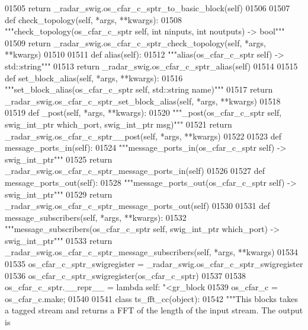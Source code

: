 \begin{DoxyCode}
{{{{{{01505         \textcolor{keywordflow}{return} \_radar\_swig.os\_cfar\_c\_sptr\_to\_basic\_block(self)
01506 
01507     \textcolor{keyword}{def }check_topology(self, *args, **kwargs):
01508         \textcolor{stringliteral}{"""check\_topology(os\_cfar\_c\_sptr self, int ninputs, int noutputs) -> bool"""}
01509         \textcolor{keywordflow}{return} \_radar\_swig.os\_cfar\_c\_sptr\_check\_topology(self, *args, **kwargs)
01510 
01511     \textcolor{keyword}{def }alias(self):
01512         \textcolor{stringliteral}{"""alias(os\_cfar\_c\_sptr self) -> std::string"""}
01513         \textcolor{keywordflow}{return} \_radar\_swig.os\_cfar\_c\_sptr\_alias(self)
01514 
01515     \textcolor{keyword}{def }set_block_alias(self, *args, **kwargs):
01516         \textcolor{stringliteral}{"""set\_block\_alias(os\_cfar\_c\_sptr self, std::string name)"""}
01517         \textcolor{keywordflow}{return} \_radar\_swig.os\_cfar\_c\_sptr\_set\_block\_alias(self, *args, **kwargs)
01518 
01519     \textcolor{keyword}{def }_post(self, *args, **kwargs):
01520         \textcolor{stringliteral}{"""\_post(os\_cfar\_c\_sptr self, swig\_int\_ptr which\_port, swig\_int\_ptr msg)"""}
01521         \textcolor{keywordflow}{return} \_radar\_swig.os\_cfar\_c\_sptr\_\_post(self, *args, **kwargs)
01522 
01523     \textcolor{keyword}{def }message_ports_in(self):
01524         \textcolor{stringliteral}{"""message\_ports\_in(os\_cfar\_c\_sptr self) -> swig\_int\_ptr"""}
01525         \textcolor{keywordflow}{return} \_radar\_swig.os\_cfar\_c\_sptr\_message\_ports\_in(self)
01526 
01527     \textcolor{keyword}{def }message_ports_out(self):
01528         \textcolor{stringliteral}{"""message\_ports\_out(os\_cfar\_c\_sptr self) -> swig\_int\_ptr"""}
01529         \textcolor{keywordflow}{return} \_radar\_swig.os\_cfar\_c\_sptr\_message\_ports\_out(self)
01530 
01531     \textcolor{keyword}{def }message_subscribers(self, *args, **kwargs):
01532         \textcolor{stringliteral}{"""message\_subscribers(os\_cfar\_c\_sptr self, swig\_int\_ptr which\_port) -> swig\_int\_ptr"""}
01533         \textcolor{keywordflow}{return} \_radar\_swig.os\_cfar\_c\_sptr\_message\_subscribers(self, *args, **kwargs)
01534 
01535 os\_cfar\_c\_sptr\_swigregister = \_radar\_swig.os\_cfar\_c\_sptr\_swigregister
01536 os_cfar_c_sptr_swigregister(os\_cfar\_c\_sptr)
01537 
01538 os\_cfar\_c\_sptr.\_\_repr\_\_ = \textcolor{keyword}{lambda} self: \textcolor{stringliteral}{"<gr\_block %
01539 os\_cfar\_c = os\_cfar\_c.make;
01540 
01541 \textcolor{keyword}{class }ts_fft_cc(object):
01542     \textcolor{stringliteral}{"""This blocks takes a tagged stream and returns a FFT of the length of the input stream. The output is
}}}}}}}}
\end{DoxyCode}

